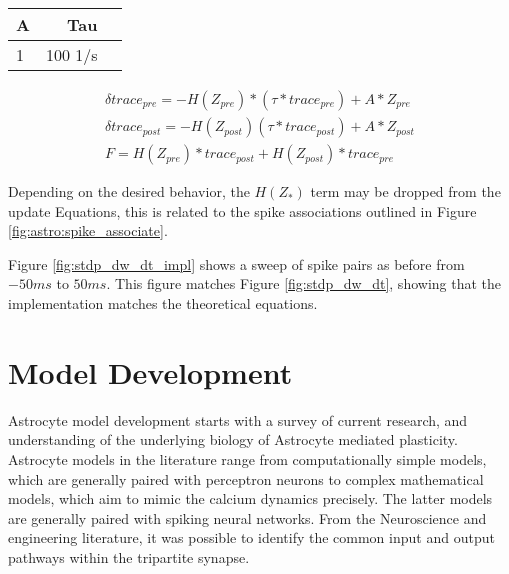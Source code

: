 \begin{table}[!htp]\centering
  \label{table:classic_stdp_params}
  \scriptsize
  \begin{tabular}{lrr}\toprule
    A &Tau \\\midrule
    1 &100 1/s \\
    \bottomrule
  \end{tabular}
\end{table}


\begin{align}
  \delta trace_{pre} = -H(Z_{pre})*(\tau * trace_{pre}) +
  A*Z_{pre} \label{eq:song_impl_pre} \\ 
  \delta trace_{post} = -H(Z_{post})(\tau * trace_{post}) +
  A*Z_{post} \label{eq:song_impl_post} \\
  F = H(Z_{pre}) * trace_{post} + H(Z_{post}) *
  trace_{pre} \label{eq:song_impl_dw}
\end{align}

Depending on the desired behavior, the $H(Z_*)$ term may be dropped from the
update Equations, this is related to the spike associations outlined in Figure
\ref{fig:astro:spike_associate}.

Figure \ref{fig:stdp_dw_dt_impl} shows a sweep of spike pairs as before from
$-50ms$ to $50ms$. This figure matches Figure \ref{fig:stdp_dw_dt}, showing that
the implementation matches the theoretical equations.




\section{Model Development}
Astrocyte model development starts with a survey of current research, and
understanding of the underlying biology of Astrocyte mediated
plasticity. Astrocyte models in the literature range from computationally simple
models, which are generally paired with perceptron neurons to complex
mathematical models, which aim to mimic the calcium dynamics precisely. The
latter models are generally paired with spiking neural networks. From the
Neuroscience and engineering literature, it was possible to identify the common
input and output pathways within the tripartite synapse. 

